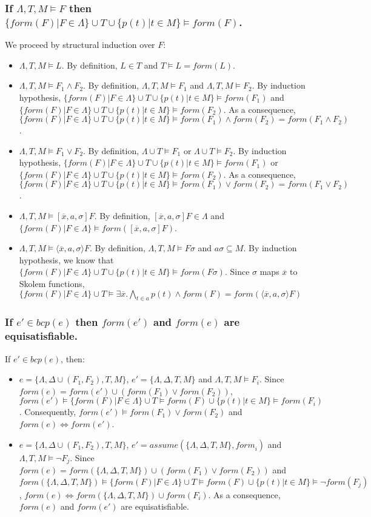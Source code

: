 \documentclass[a4paper,10pt]{report}
\newcommand{\F}{\mathit{form}}
\newcommand{\A}{\mathit{assume}}
\newcommand{\B}{\mathit{bcp}}
\begin{document}
\subsubsection*{If $\Lambda, T,M\vDash F$ then $\{\F(F)|F\in\Lambda\}\cup T
\cup\{p(t)|t\in M\}\vDash\F(F)$.}
\noindent
We proceed by structural induction over $F$:
\begin{itemize}
 \item $\Lambda,T,M\vDash L$. By definition, $L\in T$ and $T\vDash L=\F(L)$.
 \item $\Lambda,T,M\vDash F_1\wedge F_2$. By definition, $\Lambda,T,M\vDash F_1$ and
$\Lambda,T,M\vDash F_2$. By induction hypothesis, $\{\F(F)|F\in\Lambda\}\cup T
\cup\{p(t)|t\in M\}\vDash\F(F_1)$
and $\{\F(F)|F\in\Lambda\}\cup T\cup\{p(t)|t\in M\}\vDash\F(F_2)$. As a consequence,
$\{\F(F)|F\in\Lambda\}\cup T\cup\{p(t)|t\in M\}\vDash\F(F_1)\wedge\F(F_2)=\F(F_1\wedge F_2)$.
 \item $\Lambda,T,M\vDash F_1\vee F_2$. By definition, $\Lambda\cup T\vDash F_1$ or
$\Lambda\cup T\vDash F_2$. By induction hypothesis, $\{\F(F)|F\in\Lambda\}\cup T
\cup\{p(t)|t\in M\}\vDash\F(F_1)$
or $\{\F(F)|F\in\Lambda\}\cup T\cup\{p(t)|t\in M\}\vDash\F(F_2)$. As a consequence,
$\{\F(F)|F\in\Lambda\}\cup T\cup\{p(t)|t\in M\}\vDash\F(F_1)\vee\F(F_2)=\F(F_1\vee F_2)$.
 \item $\Lambda,T,M\vDash[\overline x,a,\sigma]F$. By definition,
$[\overline x,a,\sigma]F\in\Lambda$ and
$\{\F(F)|F\in\Lambda\}\vDash\F([\overline x,a,\sigma]F)$.
 \item $\Lambda,T,M\vDash\langle\overline x,a,\sigma\rangle F$. By definition,
$\Lambda,T,M\vDash F\sigma$ and $a\sigma\subseteq M$. By induction hypothesis, we know that
$\{\F(F)|F\in\Lambda\}\cup T\cup\{p(t)|t\in M\}\vDash\F(F\sigma)$.
Since $\sigma$ maps $\overline x$ to Skolem functions,
$\{\F(F)|F\in\Lambda\}\cup T\vDash\exists\overline x.\bigwedge_{t\in a} p(t)\wedge\F(F)=
\F(\langle\overline x,a,\sigma\rangle F)$
\end{itemize}

\subsubsection*{If $e'\in\B(e)$ then $\F(e')$ and $\F(e)$ are equisatisfiable.}
\noindent
If $e'\in\B(e)$, then:
\begin{itemize}
 \item $e=\{\Lambda,\Delta\cup(F_1,F_2),T,M\}$, $e'=\{\Lambda,\Delta,T,M\}$ and
$\Lambda,T,M\vDash F_i$. Since $\F(e)=\F(e')\cup(\F(F_1)\vee\F(F_2))$,
$\F(e')\vDash\{\F(F)|F\in\Lambda\}\cup T\vDash\F(F)\cup\{p(t)|t\in M\}\vDash\F(F_i)$.
Consequently, $\F(e')\vDash\F(F_1)\vee\F(F_2)$ and $\F(e)\Leftrightarrow\F(e')$.
 \item $e=\{\Lambda,\Delta\cup(F_1,F_2),T,M\}$, $e'=\A(\{\Lambda,\Delta,T,M\},\F_i)$ and
$\Lambda,T,M\vDash\neg F_j$. Since $\F(e)=\F(\{\Lambda,\Delta,T,M\})\cup(\F(F_1)\vee\F(F_2))$
and $\F(\{\Lambda,\Delta,T,M\})\vDash\{\F(F)|F\in\Lambda\}\cup T\vDash\F(F)\cup
\{p(t)|t\in M\}\vDash\neg\F(F_j)$, $\F(e)\Leftrightarrow\F(\{\Lambda,\Delta,T,M\})\cup\F(F_i)$.
As a consequence, $\F(e)$ and $\F(e')$ are equisatisfiable.
\end{itemize}
\end{document}
